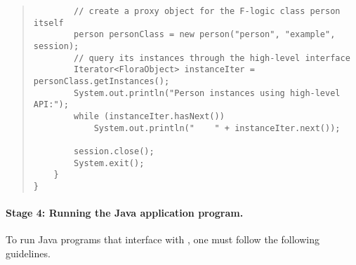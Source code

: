 \begin{quote}
\begin{verbatim}
        // create a proxy object for the F-logic class person itself
        person personClass = new person("person", "example", session);
        // query its instances through the high-level interface
        Iterator<FloraObject> instanceIter = personClass.getInstances();
        System.out.println("Person instances using high-level API:");
        while (instanceIter.hasNext())
            System.out.println("    " + instanceIter.next());
        
        session.close();
        System.exit();
    }
}
\end{verbatim}
\end{quote}

\paragraph{Stage 4: Running the Java application program.}
To run Java programs that interface with \FLSYSTEM, one must follow the
following guidelines.


